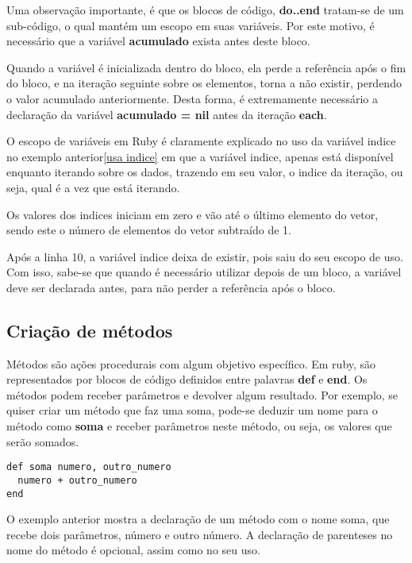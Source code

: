 \documentclass[12pt]{article}
\newcommand{\code}[1] {\textbf{#1}}
\begin{document}
Uma observação importante, é que os blocos de código, \code{do..end} tratam-se de um sub-código, o qual mantém um escopo em suas variáveis. Por este motivo, é necessário que a variável \code{acumulado} exista antes deste bloco. 

Quando a variável é inicializada dentro do bloco, ela perde a referência após o fim do bloco, e na iteração seguinte sobre os elementos, torna a não existir, perdendo o valor acumulado anteriormente. Desta forma, é extremamente necessário a declaração da variável \code{acumulado = nil} antes da iteração \code{each}.

O escopo de variáveis em Ruby é claramente explicado no uso da variável indice no exemplo anterior\ref{usa indice} em que a variável indice, apenas está disponível enquanto iterando sobre os dados, trazendo em seu valor, o indice da iteração, ou seja, qual é a vez que está iterando.

Os valores dos indices iniciam em zero e vão até o último elemento do vetor, sendo este o número de elementos do vetor subtraído de 1.

Após a linha 10, a variável indice deixa de existir, pois saiu do seu escopo de uso. Com isso, sabe-se que quando é necessário utilizar depois de um bloco, a variável deve ser declarada antes, para não perder a referência após o bloco.



\subsection{Criação de métodos}

Métodos são ações procedurais com algum objetivo específico. Em ruby, são representados por blocos de código definidos entre palavras \code{def} e \code{end}. Os métodos podem receber parâmetros e devolver algum resultado. Por exemplo, se quiser criar um método que faz uma soma, pode-se deduzir um nome para o método como \code{soma} e receber parâmetros neste método, ou seja, os valores que serão somados.

\begin{lstlisting}[caption=implementando um método de soma]
def soma numero, outro_numero
  numero + outro_numero
end
\end{lstlisting}

O exemplo anterior mostra a declaração de um método com o nome soma, que recebe dois parâmetros, número e outro número. A declaração de parenteses no nome do método é opcional, assim como no seu uso. 
\end{document}
